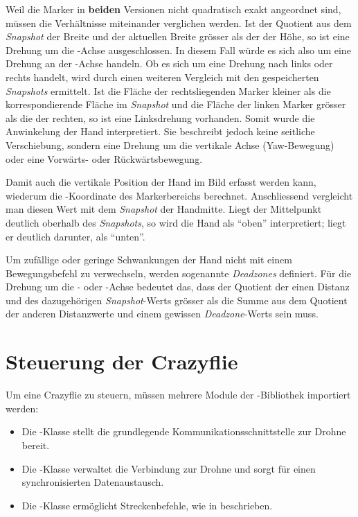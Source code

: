 Weil die Marker in \textbf{beiden} Versionen nicht quadratisch exakt angeordnet sind, müssen die Verhältnisse miteinander verglichen werden.
Ist der Quotient aus dem \textit{Snapshot} der Breite und der aktuellen Breite grösser als der der Höhe, so ist eine Drehung um die -Achse ausgeschlossen.
In diesem Fall würde es sich also um eine Drehung an der -Achse handeln.
Ob es sich um eine Drehung nach links oder rechts handelt, wird durch einen weiteren Vergleich mit den gespeicherten \textit{Snapshots} ermittelt.
Ist die Fläche der rechtsliegenden Marker kleiner als die korrespondierende Fläche im \textit{Snapshot} und die Fläche der linken Marker grösser als die der rechten, so ist eine Linksdrehung vorhanden.
Somit wurde die Anwinkelung der Hand interpretiert.
Sie beschreibt jedoch keine seitliche Verschiebung, sondern eine Drehung um die vertikale Achse (Yaw-Bewegung) oder eine Vorwärts- oder Rückwärtsbewegung.

Damit auch die vertikale Position der Hand im Bild erfasst werden kann, wiederum die -Koordinate des Markerbereichs berechnet.
Anschliessend vergleicht man diesen Wert mit dem \textit{Snapshot} der Handmitte.
Liegt der Mittelpunkt deutlich oberhalb des \textit{Snapshots}, so wird die Hand als \enquote{oben} interpretiert; liegt er deutlich darunter, als \enquote{unten}.

Um zufällige oder geringe Schwankungen der Hand nicht mit einem Bewegungsbefehl zu verwechseln, werden sogenannte \textit{Deadzones} definiert.
Für die Drehung um die - oder -Achse bedeutet das, dass der Quotient der einen Distanz und des dazugehörigen \textit{Snapshot}-Werts grösser als die Summe aus dem Quotient der anderen Distanzwerte und einem gewissen \textit{Deadzone}-Werts sein muss.

\section{Steuerung der Crazyflie}
\label{sec:cf_co}
Um eine Crazyflie zu steuern, müssen mehrere Module der -Bibliothek importiert werden:

\begin{itemize}
    \item Die -Klasse stellt die grundlegende Kommunikationsschnittstelle zur Drohne bereit.
    \item Die -Klasse verwaltet die Verbindung zur Drohne und sorgt für einen synchronisierten Datenaustausch.
    \item Die -Klasse ermöglicht Streckenbefehle, wie in  beschrieben.
\end{itemize}

